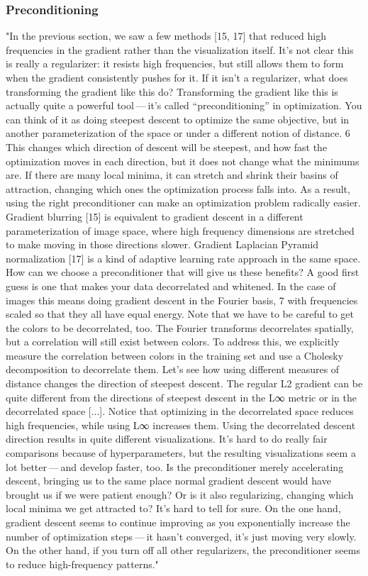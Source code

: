\documentclass[]{scrartcl}
\begin{document}
	\subsubsection{Preconditioning}
	"In the previous section, we saw a few methods [15, 17] that reduced high frequencies in the gradient rather than the visualization itself. It’s not clear this is really a regularizer: it resists high frequencies, but still allows them to form when the gradient consistently pushes for it. If it isn’t a regularizer, what does transforming the gradient like this do? Transforming the gradient like this is actually quite a powerful tool --- it’s called “preconditioning” in optimization. You can think of it as doing steepest descent to optimize the same objective, but in another parameterization of the space or under a different notion of distance. 6 This changes which direction of descent will be steepest, and how fast the optimization moves in each direction, but it does not change what the minimums are. If there are many local minima, it can stretch and shrink their basins of attraction, changing which ones the optimization process falls into. As a result, using the right preconditioner can make an optimization problem radically easier. Gradient blurring [15] is equivalent to gradient descent in a different parameterization of image space, where high frequency dimensions are stretched to make moving in those directions slower. Gradient Laplacian Pyramid normalization [17] is a kind of adaptive learning rate approach in the same space.
	How can we choose a preconditioner that will give us these beneﬁts? A good ﬁrst guess is one that makes your data decorrelated and whitened. In the case of images this means doing gradient descent in the Fourier basis, 7 with frequencies scaled so that they all have equal energy. Note that we have to be careful to get the colors to be decorrelated, too. The Fourier transforms decorrelates spatially, but a correlation will still exist between colors. To address this, we explicitly measure the correlation between colors in the training set and use a Cholesky decomposition to decorrelate them. Let’s see how using different measures of distance changes the direction of steepest descent. The regular L2 gradient can be quite different from the directions of steepest descent in the L∞ metric or in the decorrelated space [...]. Notice that optimizing in the decorrelated space reduces high frequencies, while using L∞ increases them. Using the decorrelated descent direction results in quite different visualizations. It’s hard to do really fair comparisons because of hyperparameters, but the resulting visualizations seem a lot better --- and develop faster, too.
	Is the preconditioner merely accelerating descent, bringing us to the same place normal gradient descent would have brought us if we were patient enough? Or is it also regularizing, changing which local minima we get attracted to? It’s hard to tell for sure. On the one hand, gradient descent seems to continue improving as you exponentially increase the number of optimization steps — it hasn't converged, it's just moving very slowly. On the other hand, if you turn off all other regularizers, the preconditioner seems to reduce high-frequency patterns." \cite{Olah2017}
	
\end{document}
